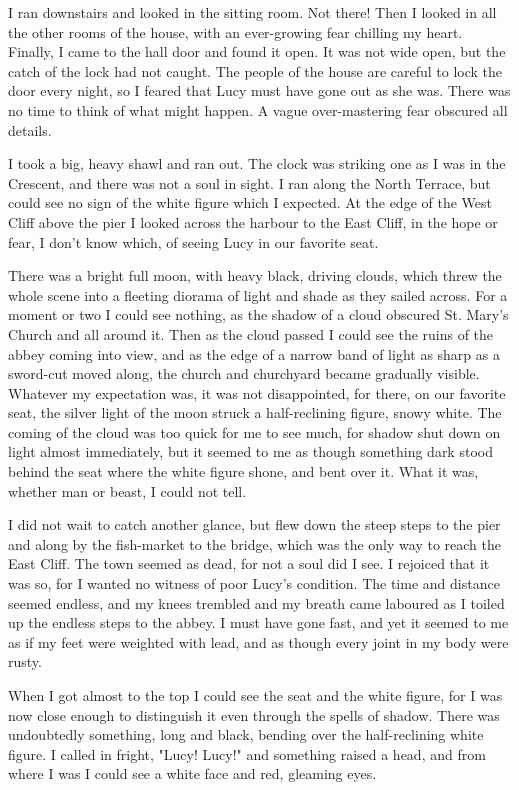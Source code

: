 I ran downstairs and looked in the sitting room. Not there! Then I looked in all the other rooms of the house, with an ever-growing fear chilling my heart. Finally, I came to the hall door and found it open. It was not wide open, but the catch of the lock had not caught. The people of the house are careful to lock the door every night, so I feared that Lucy must have gone out as she was. There was no time to think of what might happen. A vague over-mastering fear obscured all details. 

I took a big, heavy shawl and ran out. The clock was striking one as I was in the Crescent, and there was not a soul in sight. I ran along the North Terrace, but could see no sign of the white figure which I expected. At the edge of the West Cliff above the pier I looked across the harbour to the East Cliff, in the hope or fear, I don't know which, of seeing Lucy in our favorite seat. 

There was a bright full moon, with heavy black, driving clouds, which threw the whole scene into a fleeting diorama of light and shade as they sailed across. For a moment or two I could see nothing, as the shadow of a cloud obscured St. Mary's Church and all around it. Then as the cloud passed I could see the ruins of the abbey coming into view, and as the edge of a narrow band of light as sharp as a sword-cut moved along, the church and churchyard became gradually visible. Whatever my expectation was, it was not disappointed, for there, on our favorite seat, the silver light of the moon struck a half-reclining figure, snowy white. The coming of the cloud was too quick for me to see much, for shadow shut down on light almost immediately, but it seemed to me as though something dark stood behind the seat where the white figure shone, and bent over it. What it was, whether man or beast, I could not tell. 

I did not wait to catch another glance, but flew down the steep steps to the pier and along by the fish-market to the bridge, which was the only way to reach the East Cliff. The town seemed as dead, for not a soul did I see. I rejoiced that it was so, for I wanted no witness of poor Lucy's condition. The time and distance seemed endless, and my knees trembled and my breath came laboured as I toiled up the endless steps to the abbey. I must have gone fast, and yet it seemed to me as if my feet were weighted with lead, and as though every joint in my body were rusty. 

When I got almost to the top I could see the seat and the white figure, for I was now close enough to distinguish it even through the spells of shadow. There was undoubtedly something, long and black, bending over the half-reclining white figure. I called in fright, "Lucy! Lucy!" and something raised a head, and from where I was I could see a white face and red, gleaming eyes. 

